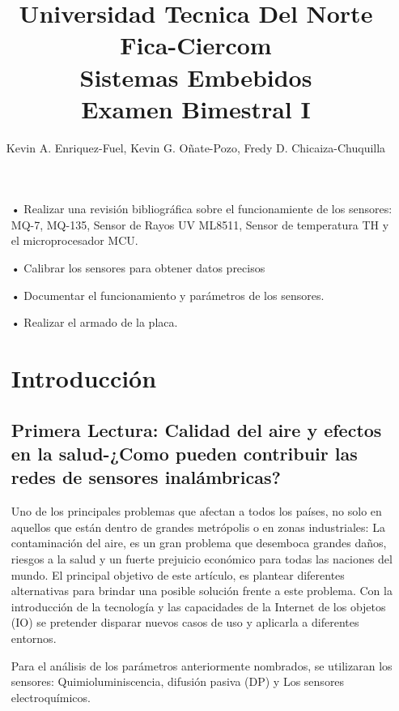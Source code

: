 \documentclass[10pt,a4paper]{article}
\begin{document}
\author{Kevin A. Enriquez-Fuel, Kevin G. Oñate-Pozo, Fredy D. Chicaiza-Chuquilla}
\title{Universidad Tecnica Del Norte\\ Fica-Ciercom\\ Sistemas Embebidos\\Examen Bimestral I \\}
\maketitle
\begin{multicols}{2}
\begin{itemize}
\section{Objetivos}
\item[•] Realizar una revisión bibliográfica sobre el funcionamiente de los sensores: MQ-7, MQ-135, Sensor de Rayos UV ML8511, Sensor de temperatura TH y el microprocesador MCU.
\item[•] Calibrar los sensores para obtener datos precisos
\item[•] Documentar el funcionamiento y parámetros de los sensores.
\item[•] Realizar el armado de la placa.
\section{Introducción}
\subsection{Primera Lectura: Calidad del aire y efectos en la salud-¿Como pueden contribuir las redes de sensores inalámbricas?}

Uno de los principales problemas que afectan a todos
los países, no solo en aquellos que están dentro de
grandes metrópolis o en zonas industriales: La contaminación
 del aire, es un gran problema que desemboca
grandes daños, riesgos a la salud y un fuerte prejuicio
económico para todas las naciones del mundo.
El principal objetivo de este artículo, es plantear
diferentes alternativas para brindar una posible solución
 frente a este problema. Con la introducción de la
tecnología y las capacidades de la Internet de los objetos
(IO) se pretender disparar nuevos casos de uso y
aplicarla a diferentes entornos.

Para el análisis de los parámetros anteriormente
nombrados, se utilizaran los sensores: Quimioluminiscencia,
difusión pasiva (DP) y Los sensores electroquímicos.


\end{itemize}
\end{multicols}
\end{document}
